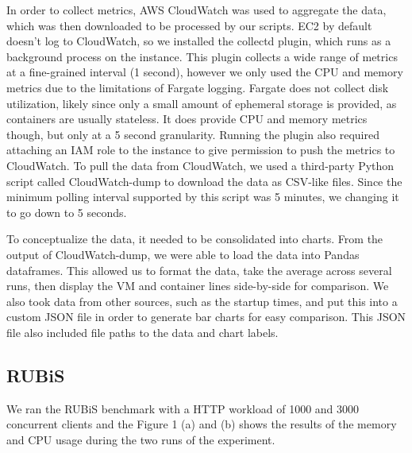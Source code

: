 \documentclass[11pt]{article}
\begin{document}
In order to collect metrics, AWS CloudWatch was used to aggregate the data, which was then downloaded to be processed by our scripts. EC2 by default doesn't log to CloudWatch, so we installed the collectd plugin, which runs as a background process on the instance. This plugin collects a wide range of metrics at a fine-grained interval (1 second), however we only used the CPU and memory metrics due to the limitations of Fargate logging. Fargate does not collect disk utilization, likely since only a small amount of ephemeral storage is provided, as containers are usually stateless. It does provide CPU and memory metrics though, but only at a 5 second granularity. Running the plugin also required attaching an IAM role to the instance to give permission to push the metrics to CloudWatch. To pull the data from CloudWatch, we used a third-party Python script called CloudWatch-dump to download the data as CSV-like files. Since the minimum polling interval supported by this script was 5 minutes, we changing it to go down to 5 seconds.

To conceptualize the data, it needed to be consolidated into charts. From the output of CloudWatch-dump, we were able to load the data into Pandas dataframes. This allowed us to format the data, take the average across several runs, then display the VM and container lines side-by-side for comparison. We also took data from other sources, such as the startup times, and put this into a custom JSON file in order to generate bar charts for easy comparison. This JSON file also included file paths to the data and chart labels.

\subsection{RUBiS}

We ran the RUBiS benchmark with a HTTP workload of 1000 and 3000 concurrent clients and the Figure 1 (a) and (b) shows the results of the memory and CPU usage during the two runs of the experiment.
\end{document}
